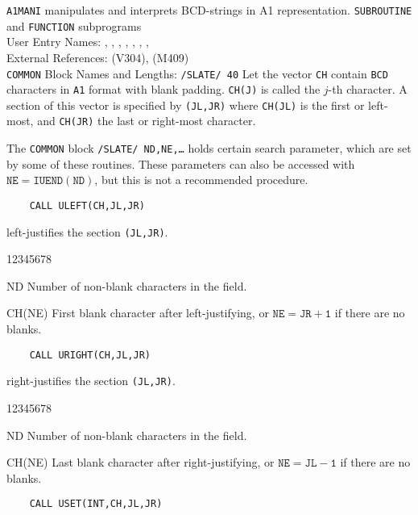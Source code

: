                     
                     
              
      
{\tt A1MANI} manipulates and interprets BCD-strings in A1 representation.
\Structure
{\tt SUBROUTINE} and {\tt FUNCTION} subprograms \\
User Entry Names: , , ,
, , , ,
 \\
External References:  (V304),  (M409) \\
{\tt COMMON} Block  Names and Lengths:  {\tt /SLATE/ 40}
\Usage
Let the vector {\tt CH} contain {\tt BCD} characters in {\tt A1} format
with blank padding. {\tt CH(J)} is called the $j$-th character. A section
of this vector is specified by {\tt (JL,JR)} where {\tt CH(JL)} is the
first or left-most, and {\tt CH(JR)} the last or right-most character.
\par
The {\tt COMMON} block {\tt /SLATE/ ND,NE,\ldots} holds certain search
parameter, which are set by some of these routines. These
parameters can also be accessed with $\mathtt{NE=IUEND(ND)}$, but this is
not a recommended procedure.
\begin{verbatim}
    CALL ULEFT(CH,JL,JR)
\end{verbatim}
left-justifies the section {\tt (JL,JR)}.
\begin{DLtt}{12345678}
\item [ND] Number of non-blank characters in the field.
\item [CH(NE)] First blank character after left-justifying,
or $\mathtt{NE=JR+1}$ if there are no blanks.
\end{DLtt}
\begin{verbatim}
    CALL URIGHT(CH,JL,JR)
\end{verbatim}
right-justifies the section {\tt (JL,JR)}.
\begin{DLtt}{12345678}
\item [ND] Number of non-blank characters in the field.
\item [CH(NE)] Last blank character after right-justifying,
or $\mathtt{NE=JL-1}$ if there are no blanks.
\end{DLtt}
\begin{verbatim}
    CALL USET(INT,CH,JL,JR)
\end{verbatim}
